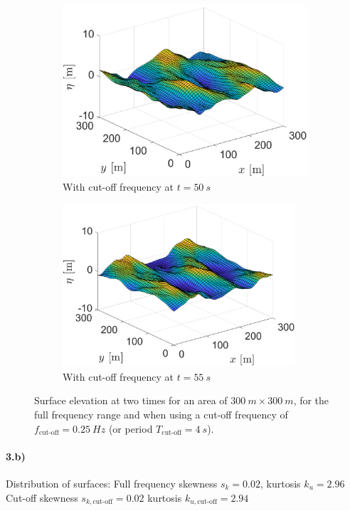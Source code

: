 \begin{figure}[htb]
\begin{subfigure}[t]{.5\textwidth}
    \includegraphics[width=.95\textwidth,trim=0cm 0cm 0.0cm 0cm, clip=true]{Figures/Plots/etadir1.eps}
    \caption{With cut-off frequency at $t=\SI{50}{s}$}
    \label{fig:etaIFFTdir1}
\end{subfigure}%
\begin{subfigure}[t]{.5\textwidth}
    \centering
    \includegraphics[width=0.95\textwidth,trim=0cm 0cm 0cm 0cm, clip=true]{Figures/Plots/etadir2.eps}
    \caption{With cut-off frequency at $t=\SI{55}{s}$}
    \label{fig:etaIFFTdir2}
\end{subfigure}
\caption{Surface elevation at two times for an area of $\SI{300}{m}\times\SI{300}{m}$, for the full frequency range and when using a cut-off frequency of $f_{\text{cut-off}}=\SI{0.25}{Hz}$ (or period $T_{\text{cut-off}}=\SI{4}{s}$).}
\label{fig:etaIFFTdirection}
\end{figure}

\paragraph{3.b) } Distribution of surfaces: Full frequency skewness $s_k=0.02$, kurtosis $k_{u}=2.96$ Cut-off skewness $s_{k,\text{cut-off}}=0.02$ kurtosis $k_{u,\text{cut-off}}=2.94$


